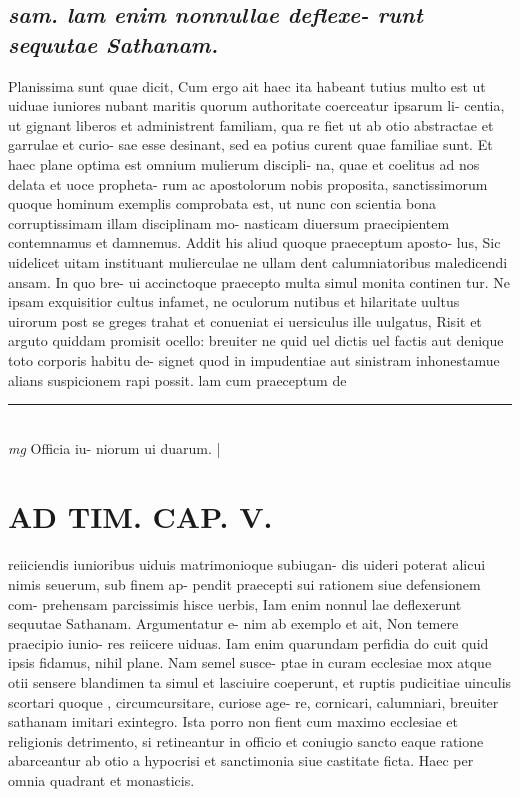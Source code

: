 \documentclass{article}
\begin{document}
\begin{pages}
\subsection*{\textit{sam. lam enim nonnullae deflexe- runt sequutae Sathanam. }}\pstart Planissima sunt quae dicit, Cum ergo ait haec ita habeant tutius multo est ut uiduae iuniores nubant maritis quorum authoritate coerceatur ipsarum li- centia, ut gignant liberos et administrent familiam, qua re fiet ut ab otio abstractae et garrulae et curio- sae esse desinant, sed ea potius curent quae familiae sunt. Et haec plane optima est omnium mulierum discipli- na, quae et coelitus ad nos delata et uoce propheta- rum ac apostolorum nobis proposita, sanctissimorum quoque hominum exemplis comprobata est, ut nunc con scientia bona corruptissimam illam disciplinam mo- nasticam diuersum praecipientem contemnamus et damnemus. Addit his aliud quoque praeceptum aposto- lus, Sic uidelicet uitam instituant mulierculae ne ullam dent calumniatoribus maledicendi ansam. In quo bre- ui accinctoque praecepto multa simul monita continen tur. Ne ipsam exquisitior cultus infamet, ne oculorum nutibus et hilaritate uultus uirorum post se greges trahat et conueniat ei uersiculus ille uulgatus, Risit et arguto quiddam promisit ocello: breuiter ne quid uel dictis uel factis aut denique toto corporis habitu de- signet quod in impudentiae aut sinistram inhonestamue alians suspicionem rapi possit. lam cum praeceptum de  \pend
\vspace{0.5cm}\noindent
\vspace{0.2cm}\rule{1cm}{0.2pt}\\ 
\hspace{0.2cm}\textit{mg}
\footnotesize Officia iu- niorum ui duarum. 
\normalsize| 
\section*{AD TIM. CAP. V. }
\marginpar{[ p.155 ]}\pstart reiiciendis iunioribus uiduis matrimonioque subiugan- dis uideri poterat alicui nimis seuerum, sub finem ap- pendit praecepti sui rationem siue defensionem com- prehensam parcissimis hisce uerbis, Iam enim nonnul lae deflexerunt sequutae Sathanam. Argumentatur e- nim ab exemplo et ait, Non temere praecipio iunio- res reiicere uiduas. Iam enim quarundam perfidia do cuit quid ipsis fidamus, nihil plane. Nam semel susce- ptae in curam ecclesiae mox atque otii sensere blandimen ta simul et lasciuire coeperunt, et ruptis pudicitiae uinculis scortari quoque , circumcursitare, curiose age- re, cornicari, calumniari, breuiter sathanam imitari exintegro. Ista porro non fient cum maximo ecclesiae et religionis detrimento, si retineantur in officio et coniugio sancto eaque ratione abarceantur ab otio a hypocrisi et sanctimonia siue castitate ficta. Haec per omnia quadrant et monasticis.  \pend
{}
{}

\end{pages}
\end{document}
